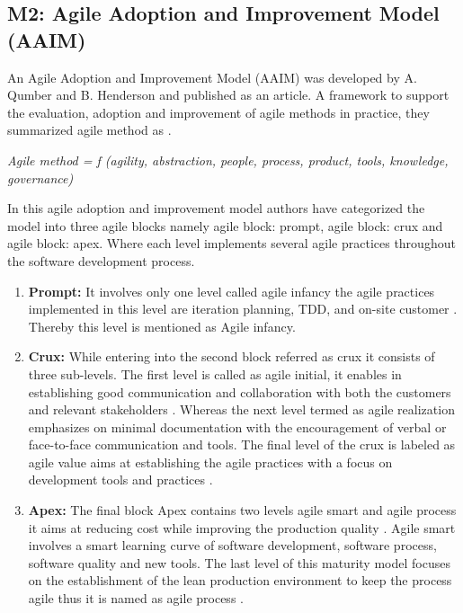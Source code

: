 \documentclass[a4paper,oneside]{bth}
\begin{document}
\subsection{M2: Agile Adoption and Improvement Model (AAIM)}
An Agile Adoption and Improvement Model (AAIM) was developed by A. Qumber and B. Henderson and published as an article. A framework to support the evaluation, adoption and improvement of agile methods in practice, they summarized agile method as \cite{qumer_framework_2008}.
\begin{center}
\textit{Agile method = f (agility, abstraction, people, process, product, tools, knowledge, governance)}
\end{center}
In this agile adoption and improvement model authors have categorized the model into three agile blocks namely agile block: prompt, agile block: crux and agile block: apex. Where each level implements several agile practices throughout the software development process.
\begin{enumerate}
\item \textbf{Prompt:} It involves only one level called agile infancy the agile practices implemented in this level are iteration planning, TDD, and on-site customer \cite{qumer_framework_2008}. Thereby this level is mentioned as Agile infancy.
\item \textbf{Crux:} While entering into the second block referred as crux it consists of three sub-levels. The first level is called as agile initial, it enables in establishing good communication and collaboration with both the customers and relevant stakeholders \cite{qumer_framework_2008}. Whereas the next level termed as agile realization emphasizes on minimal documentation with the encouragement of verbal or face-to-face communication and tools. The final level of the crux is labeled as agile value aims at establishing the agile practices with a focus on development tools and practices \cite{qumer_framework_2008}.
\item \textbf{Apex:} The final block Apex contains two levels agile smart and agile process it aims at reducing cost while improving the production quality \cite{qumer_framework_2008}. Agile smart involves a smart learning curve of software development, software process, software quality and new tools. The last level of this maturity model focuses on the establishment of the lean production environment to keep the process agile thus it is named as agile process \cite{qumer_framework_2008}.
\end{enumerate}
\end{document}
